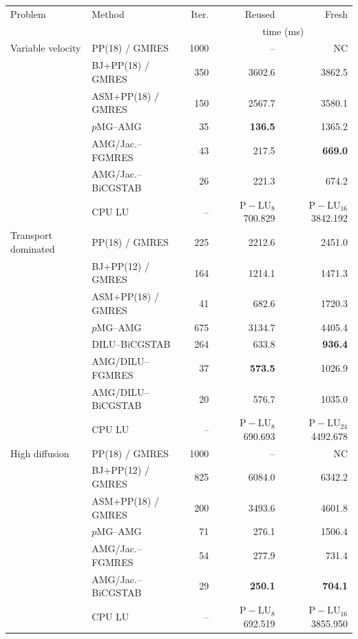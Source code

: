 \begin{tabular}{llrrr}
\toprule
Problem & Method & Iter. & Reused & Fresh \\
 & & & \multicolumn{2}{c}{time (ms)} \\
\midrule
Variable velocity & PP(18) / GMRES & 1000 & -- & NC \\
 & BJ+PP(18) / GMRES & 350 & 3602.6 & 3862.5 \\
 & ASM+PP(18) / GMRES & 150 & 2567.7 & 3580.1 \\
 & $p$MG--AMG & 35 & \textbf{136.5} & 1365.2 \\
 & AMG/Jac.--FGMRES & 43 & 217.5 & \textbf{669.0} \\
 & AMG/Jac.--BiCGSTAB & 26 & 221.3 & 674.2 \\
 & CPU LU & -- & $\mathrm{P\!-\!LU}_{8}$ 700.829 & $\mathrm{P\!-\!LU}_{16}$ 3842.192 \\
\midrule
Transport dominated & PP(18) / GMRES & 225 & 2212.6 & 2451.0 \\
 & BJ+PP(12) / GMRES & 164 & 1214.1 & 1471.3 \\
 & ASM+PP(18) / GMRES & 41 & 682.6 & 1720.3 \\
 & $p$MG--AMG & 675 & 3134.7 & 4405.4 \\
 & DILU--BiCGSTAB & 264 & 633.8 & \textbf{936.4} \\
 & AMG/DILU--FGMRES & 37 & \textbf{573.5} & 1026.9 \\
 & AMG/DILU--BiCGSTAB & 20 & 576.7 & 1035.0 \\
 & CPU LU & -- & $\mathrm{P\!-\!LU}_{8}$ 690.693 & $\mathrm{P\!-\!LU}_{24}$ 4492.678 \\
\midrule
High diffusion & PP(18) / GMRES & 1000 & -- & NC \\
 & BJ+PP(12) / GMRES & 825 & 6084.0 & 6342.2 \\
 & ASM+PP(18) / GMRES & 200 & 3493.6 & 4601.8 \\
 & $p$MG--AMG & 71 & 276.1 & 1506.4 \\
 & AMG/Jac.--FGMRES & 54 & 277.9 & 731.4 \\
 & AMG/Jac.--BiCGSTAB & 29 & \textbf{250.1} & \textbf{704.1} \\
 & CPU LU & -- & $\mathrm{P\!-\!LU}_{8}$ 692.519 & $\mathrm{P\!-\!LU}_{16}$ 3855.950 \\
\bottomrule
\end{tabular}

